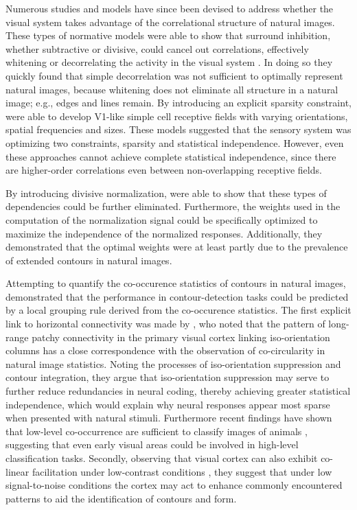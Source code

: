 Numerous studies and models have since been devised to address whether
the visual system takes advantage of the correlational structure of
natural images. These types of normative models were able to show that
surround inhibition, whether subtractive or divisive, could cancel out
correlations, effectively whitening or decorrelating the activity in
the visual system \citep{Srinivasan1982, Atick1992}. In doing so they
quickly found that simple decorrelation was not sufficient to
optimally represent natural images, because whitening does not
eliminate all structure in a natural image; e.g., edges and lines
remain. By introducing an explicit sparsity constraint,
\cite{Olshausen1996} were able to develop V1-like simple cell
receptive fields with varying orientations, spatial frequencies and
sizes. These models suggested that the sensory system was optimizing
two constraints, sparsity and statistical independence. However, even
these approaches cannot achieve complete statistical independence,
since there are higher-order correlations even between non-overlapping
receptive fields.

By introducing divisive normalization, \cite{Schwartz2001a} were able
to show that these types of dependencies could be further
eliminated. Furthermore, the weights used in the computation of the
normalization signal could be specifically optimized to maximize the
independence of the normalized responses. Additionally, they
demonstrated that the optimal weights were at least partly due to the
prevalence of extended contours in natural images.

Attempting to quantify the co-occurence statistics of contours in
natural images, \cite{Geisler2001} demonstrated that the performance
in contour-detection tasks could be predicted by a local grouping rule
derived from the co-occurence statistics. The first explicit link to
horizontal connectivity was made by \cite{Sigman2001}, who noted that
the pattern of long-range patchy connectivity in the primary visual
cortex linking iso-orientation columns has a close correspondence with
the observation of co-circularity in natural image statistics. Noting
the processes of iso-orientation suppression and contour integration,
they argue that iso-orientation suppression may serve to further
reduce redundancies in neural coding, thereby achieving greater
statistical independence, which would explain why neural responses
appear most sparse when presented with natural stimuli. Furthermore
recent findings have shown that low-level co-occurrence are sufficient
to classify images of animals \citep{Perrinet2015}, suggesting that
even early visual areas could be involved in high-level classification
tasks. Secondly, observing that visual cortex can also exhibit
co-linear facilitation under low-contrast conditions
\citep{Sceniak1999, Kapadia1999}, they suggest that under low
signal-to-noise conditions the cortex may act to enhance commonly
encountered patterns to aid the identification of contours and form.

